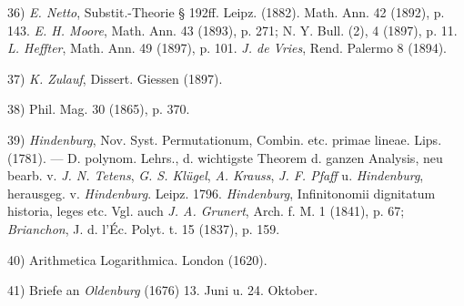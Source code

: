 \vfill
\leftline{\rule{2in}{0.4pt}}
\vspace{0.2cm}
{
\footnotesize
36) \textit{E. Netto}, Substit.-Theorie § 192ff. Leipz. (1882). Math. Ann. 42 (1892), p. 143. \textit{E. H. Moore}, Math. Ann. 43 (1893), p. 271; N. Y. Bull. (2), 4 (1897), p. 11. \textit{L. Heffter}, Math. Ann. 49 (1897), p. 101. \textit{J. de Vries}, Rend. Palermo 8 (1894).

37) \textit{K. Zulauf}, Dissert. Giessen (1897).

38) Phil. Mag. 30 (1865), p. 370.

39) \textit{Hindenburg}, Nov. Syst. Permutationum, Combin. etc. primae lineae. Lips. (1781). — D. polynom. Lehrs., d. wichtigste Theorem d. ganzen Analysis, neu bearb. v. \textit{J. N. Tetens}, \textit{G. S. Klügel}, \textit{A. Krauss}, \textit{J. F. Pfaff} u. \textit{Hindenburg}, herausgeg. v. \textit{Hindenburg}. Leipz. 1796. \textit{Hindenburg}, Infinitonomii dignitatum historia, leges etc. Vgl. auch \textit{J. A. Grunert}, Arch. f. M. 1 (1841), p. 67; \textit{Brianchon}, J. d. l'Éc. Polyt. t. 15 (1837), p. 159.

40) Arithmetica Logarithmica. London (1620).

41) Briefe an \textit{Oldenburg} (1676) 13. Juni u. 24. Oktober.

}
